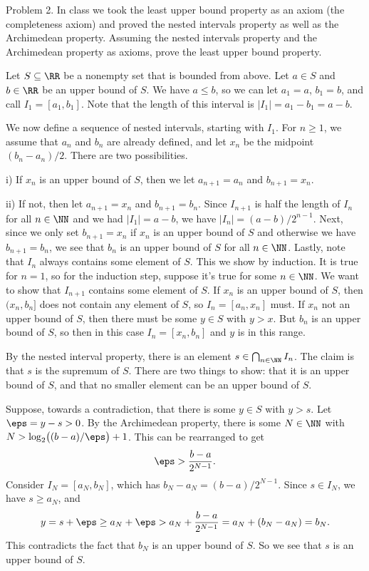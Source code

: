 \proclaim Problem 2. In class we took the least upper bound property as an axiom (the completeness axiom)
and proved the nested intervals property as well as the Archimedean property.
Assuming the nested intervals property and the Archimedean property as axioms, prove the
least upper bound property.

\proof Let $S\subseteq \RR$ be a nonempty set that is bounded from above. Let $a\in S$ and $b\in \RR$
be an upper bound of $S$. We have $a\le b$, so we can let $a_1 = a$, $b_1 = b$, and call $I_1 = [a_1, b_1]$.
Note that the length of this interval is $|I_1| = a_1 - b_1 = a-b$.

We now define a sequence of nested intervals, starting with $I_1$. For $n\ge 1$, we assume that $a_n$
and $b_n$ are already defined, and let $x_n$ be the midpoint $(b_n - a_n)/2$. There are two possibilities.
\medskip
\item{i)} If $x_n$ is an upper bound of $S$, then we let $a_{n+1} = a_n$ and $b_{n+1} = x_n$.
\smallskip
\item{ii)} If not, then let $a_{n+1} = x_n$ and $b_{n+1} = b_n$.
\medskip
Since $I_{n+1}$ is half the length of $I_n$ for all $n\in \NN$ and we had $|I_1| = a-b$, we have
$|I_n| = (a-b)/2^{n-1}$. Next, since we only set $b_{n+1} = x_n$ if $x_n$ is an upper bound of $S$
and otherwise we have $b_{n+1} = b_n$, we see that $b_n$ is an upper bound of $S$ for all $n\in \NN$.
Lastly, note that $I_n$ always contains some element of $S$. This we show by induction. It is true for $n=1$,
so for the induction step, suppose it's true for some $n\in \NN$. We want to show that $I_{n+1}$ contains
some element of $S$. If $x_n$ is an upper bound of $S$, then $(x_n, b_n]$ does not contain any element
of $S$, so $I_n = [a_n, x_n]$ must. If $x_n$ not an upper bound of $S$, then there must be some $y\in S$
with $y>x$. But $b_n$ is an upper bound of $S$, so then in this case $I_n = [x_n, b_n]$ and $y$ is in
this range.

By the nested interval property, there is an element $s\in \bigcap_{n\in \NN} I_n$. The claim is that
$s$ is the supremum of $S$. There are two things to show: that it is an upper bound of $S$, and that
no smaller element can be an upper bound of $S$.

Suppose, towards a contradiction, that there is some $y\in S$ with $y > s$. Let $\eps = y-s > 0$. By the
Archimedean property, there is some $N\in \NN$ with $N > \log_2\bigl( (b-a)/\eps\bigr) + 1$. This can
be rearranged to get
$$\eps > {b-a \over 2^{N-1}}.$$
Consider $I_N = [a_N , b_N]$, which has $b_N - a_N = (b-a) / 2^{N-1}$. Since $s\in I_N$, we have
$s \ge a_N$, and
$$ y = s+\eps \ge a_N + \eps > a_N + {b-a\over 2^{N-1}} = a_N + (b_N - a_N) = b_N.$$
This contradicts the fact that $b_N$ is an upper bound of $S$. So we see that $s$ is an upper bound of $S$.


